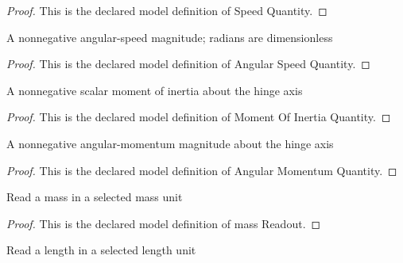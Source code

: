 \begin{proof}
  This is the declared model definition of Speed Quantity.
\end{proof}
\begin{definition}
  \label{def:physics:phyx-mini-0827:phyxminiproblems-problemphyxmini0827-angularspeedquantity}
  A nonnegative angular-speed magnitude; radians are dimensionless
\end{definition}
\begin{proof}
  This is the declared model definition of Angular Speed Quantity.
\end{proof}
\begin{definition}
  \label{def:physics:phyx-mini-0827:phyxminiproblems-problemphyxmini0827-momentofinertiaquantity}
  A nonnegative scalar moment of inertia about the hinge axis
\end{definition}
\begin{proof}
  This is the declared model definition of Moment Of Inertia Quantity.
\end{proof}
\begin{definition}
  \label{def:physics:phyx-mini-0827:phyxminiproblems-problemphyxmini0827-angularmomentumquantity}
  A nonnegative angular-momentum magnitude about the hinge axis
\end{definition}
\begin{proof}
  This is the declared model definition of Angular Momentum Quantity.
\end{proof}
\begin{definition}
  \label{def:physics:phyx-mini-0827:phyxminiproblems-problemphyxmini0827-massreadout}
  Read a mass in a selected mass unit
\end{definition}
\begin{proof}
  This is the declared model definition of mass Readout.
\end{proof}
\begin{definition}
  \label{def:physics:phyx-mini-0827:phyxminiproblems-problemphyxmini0827-lengthreadout}
  Read a length in a selected length unit
\end{definition}
